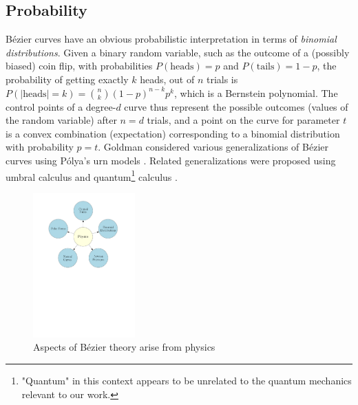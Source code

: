 \documentclass[12pt,final,3p]{elsarticle}
\begin{document}
\subsection{Probability}\label{sec:motivation:prob}
B\'{e}zier curves have an obvious probabilistic interpretation in terms of \emph{binomial distributions}. Given a binary random variable, such as the outcome of a (possibly biased) coin flip, with probabilities $P(\mathrm{heads}) = p$ and $P(\mathrm{tails}) = 1-p$, the probability of getting exactly $k$ heads, out of $n$ trials is $P(\left| \mathrm{heads}\right| = k) = {n \choose k} (1-p)^{n-k}p^{k} $, which is a Bernstein polynomial. The control points of a degree-$d$ curve thus represent the possible outcomes (values of the random variable) after $n = d$ trials, and a point on the curve for parameter $t$ is a convex combination (expectation) corresponding to a binomial distribution with probability $p = t$. Goldman considered various generalizations of B\'{e}zier curves using P\'{o}lya's urn models \cite{goldman1985polya}. Related generalizations were proposed using umbral calculus \cite{winkel2001generalized,winkel2014generalization,winkel2015generalization,winkel2016generalization} and quantum\footnote{"Quantum" in this context appears to be unrelated to the quantum mechanics relevant to our work.} calculus \cite{orucc2003q,goldman2012formulas,goldman2015quantum}.

\begin{figure}[h]
	\centering
	\includegraphics[width=0.35\textwidth, keepaspectratio]{figures/circles.pdf}
	\caption{Aspects of B\'{e}zier theory arise from physics}
	\label{fig:circles}
\end{figure}
\end{document}
